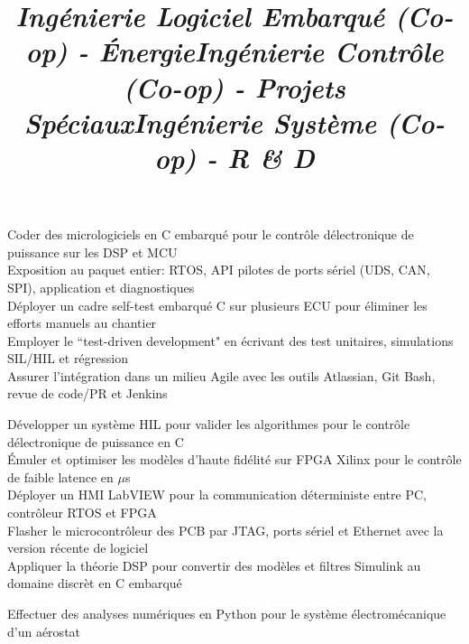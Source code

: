\documentclass[mm]{res}
\begin{document}
\begin{resume}
\title{\textsl{Ing\'enierie Logiciel Embarqu\'e (Co-op) - \'Energie}}
\begin{position}
\tb Coder des micrologiciels en C embarqu\'e pour le contr\^ole d\textquotesingle \'electronique de puissance sur les DSP et MCU\\
\tb Exposition au paquet entier: RTOS, API pilotes de ports s\'eriel (UDS, CAN, SPI), application et diagnostiques\\
\tb D\'eployer un cadre self-test embarqu\'e C sur plusieurs ECU pour \'eliminer les efforts manuels au chantier\\
\tb Employer le ``test-driven development" en \'ecrivant des test unitaires, simulations SIL/HIL et r\'egression\\
\tb Assurer l'int\'egration dans un milieu Agile avec les outils Atlassian, Git Bash, revue de code/PR et Jenkins
\end{position}

\title{\textsl{Ing\'enierie Contr\^ole (Co-op) - Projets Sp\'eciaux}}
\begin{position}
\tb D\'evelopper un syst\`eme HIL pour valider les algorithmes pour le contr\^ole d\textquotesingle \'electronique de puissance en C\\
\tb \'Emuler et optimiser les mod\`eles d'haute fid\'elit\'e sur FPGA Xilinx pour le contr\^ole de faible latence en $\mu$s\\
\tb D\'eployer un HMI LabVIEW pour la communication d\'eterministe entre PC, contr\^oleur RTOS et FPGA\\
\tb Flasher le microcontr\^oleur des PCB par JTAG, ports s\'eriel et Ethernet avec la version r\'ecente de logiciel \\
\tb Appliquer la th\'eorie DSP pour convertir des mod\`eles et filtres Simulink au domaine discr\`et en C embarqu\'e
\end{position}

\title{\textsl{Ing\'enierie Syst\`eme (Co-op) - R \& D}}
\begin{position}
\tb Effectuer des analyses num\'eriques en Python pour le syst\`eme \'electrom\'ecanique d'un a\'erostat
\end{position}


\end{resume}
\end{document}
